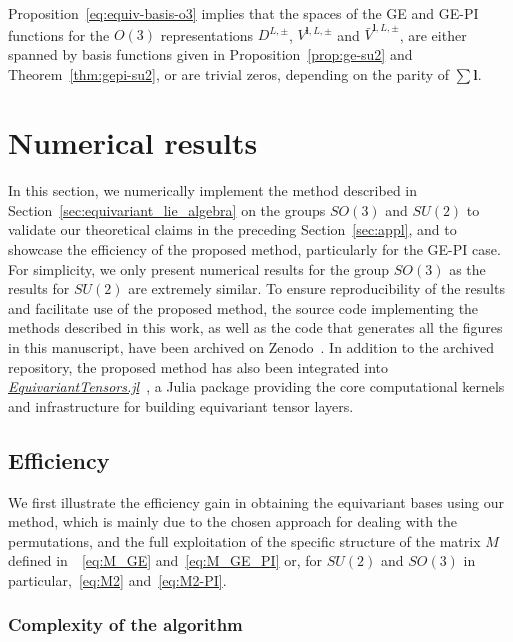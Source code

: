 \documentclass{article}
\newcommand{\bV}{{\bar V}}
\numberwithin{equation}{section}
\def\bl{{\bm l}}
\def\MlL{{M}}
\begin{document}
Proposition~\ref{eq:equiv-basis-o3} implies that the spaces of the GE and GE-PI functions for the $O(3)$ representations $D^{L,\pm}$, $V^{\bl,L,\pm}$ and $\bV^{\bl,L,\pm}$, are either spanned by basis functions given in Proposition~\ref{prop:ge-su2} and Theorem~\ref{thm:gepi-su2}, or are trivial zeros, depending on the parity of $\sum\bl$. 


\section{Numerical results}
\label{sec:num}

In this section, we numerically implement the method described in Section~\ref{sec:equivariant_lie_algebra} on the groups $SO(3)$ and $SU(2)$ to validate our theoretical claims in the preceding Section~\ref{sec:appl}, and to showcase the efficiency of the proposed method, particularly for the GE-PI case. 
For simplicity, we only present numerical results for the group $SO(3)$ as the results for $SU(2)$ are extremely similar.
To ensure reproducibility of the results and facilitate use of the proposed method, the source code implementing the methods described in this work, as well as the code that generates all the figures in this manuscript, have been archived on Zenodo~\cite{zhang2026zenodo}. In addition to the archived repository, the proposed method has also been integrated into \href{https://github.com/ACEsuit/EquivariantTensors.jl}{\emph{EquivariantTensors.jl}}~\cite{ortner2024et}, a Julia package providing the core computational kernels and infrastructure for building equivariant tensor layers.

\subsection{Efficiency}\label{sec:efficiency}


We first illustrate the efficiency gain in obtaining the equivariant bases using our method, which is mainly due to the chosen approach for dealing with the permutations, and the full exploitation of the specific structure of the matrix $\MlL$ defined in~~\eqref{eq:M_GE} and~\eqref{eq:M_GE_PI} or, for $SU(2)$ and $SO(3)$ in particular,~\eqref{eq:M2} and~\eqref{eq:M2-PI}. 

\subsubsection{Complexity of the algorithm}\label{sec:num-complexity}
\end{document}
